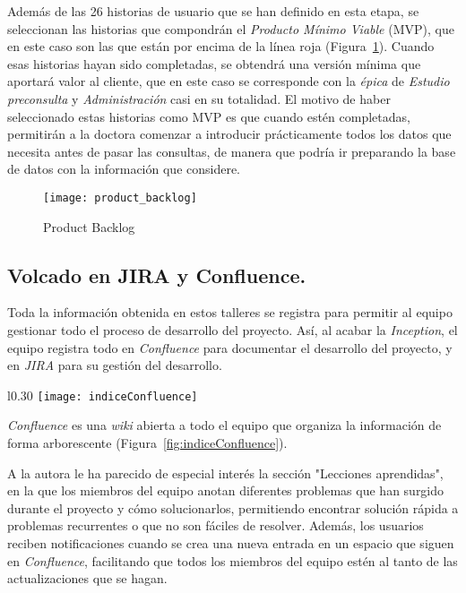 Además de las 26 historias de usuario que se han definido en esta etapa, se seleccionan las historias que compondrán el \emph{Producto Mínimo Viable} (MVP), que en este caso son las que están por encima de la línea roja (Figura~\ref{fig:backlog}). Cuando esas historias hayan sido completadas, se obtendrá una versión mínima que aportará valor al cliente, que en este caso se corresponde con la \emph{épica} de \emph{Estudio preconsulta} y \emph{Administración} casi en su totalidad. El motivo de haber seleccionado estas historias como MVP es que cuando estén completadas, permitirán a la doctora comenzar a introducir prácticamente todos los datos que necesita antes de pasar las consultas, de manera que podría ir preparando la base de datos con la información que considere.
\\
\begin{figure}[!h]
\begin{center}
\texttt{[image: product\_backlog]}
\caption{Product Backlog}
\label{fig:backlog}
\end{center}
\end{figure}

\subsection{Volcado en JIRA y Confluence.}
\label{subsec:volcado}

Toda la información obtenida en estos talleres se registra para permitir al equipo gestionar todo el proceso de desarrollo del proyecto. Así, al acabar la \emph{Inception}, el equipo registra todo en \emph{Confluence} para documentar el desarrollo del proyecto, y en \emph{JIRA} para su gestión del desarrollo.

\begin{wrapfigure}{l}{0.30\textwidth} %
    \centering
    \texttt{[image: indiceConfluence]}
    \caption{Indice de la documentación del proyecto}
    \label{fig:indiceConfluence}
\end{wrapfigure}

\emph{Confluence} es una \emph{wiki} abierta a todo el equipo que organiza la información de forma arborescente (Figura~\ref{fig:indiceConfluence}).

A la autora le ha parecido de especial interés la sección "Lecciones aprendidas", en la que los miembros del equipo anotan diferentes problemas que han surgido durante el proyecto y cómo solucionarlos, permitiendo encontrar solución rápida a problemas recurrentes o que no son fáciles de resolver. Además, los usuarios reciben notificaciones cuando se crea una nueva entrada en un espacio que siguen en \emph{Confluence}, facilitando que todos los miembros del equipo estén al tanto de las actualizaciones que se hagan.


